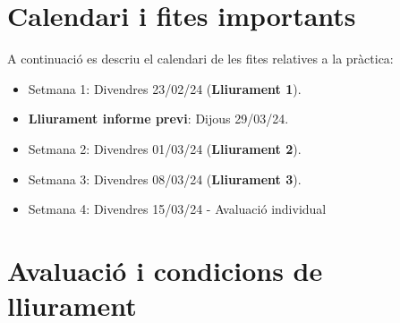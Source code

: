 \documentclass[12pt,a4paper]{article}
\begin{document}
\begin{enumerate}
\end{enumerate}




\section{Calendari i fites importants}

A continuació es descriu el calendari de les fites relatives a la pràctica:
\begin{itemize}
    
    \item Setmana 1: Divendres 23/02/24 (\textbf{Lliurament 1}).
    \item \textbf{Lliurament informe previ}: Dijous 29/03/24.
    \item Setmana 2: Divendres 01/03/24 (\textbf{Lliurament 2}).
    \item Setmana 3: Divendres 08/03/24 (\textbf{Lliurament 3}).
    \item Setmana 4: Divendres 15/03/24  - Avaluació individual
\end{itemize}

\section{Avaluació i condicions de lliurament}
\end{document}
